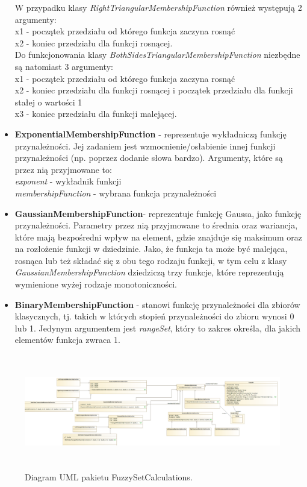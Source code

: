 \documentclass{classrep}
\begin{document}
\begin{itemize}
    W przypadku klasy \textit{RightTriangularMembershipFunction} również występują 2 argumenty:\\
    x1 - początek przedziału od którego funkcja zaczyna rosnąć \\
    x2 - koniec przedziału dla funkcji rosnącej. \\
    Do funkcjonowania klasy \textit{BothSidesTriangularMembershipFunction} niezbędne są natomiast 3 argumenty: \\
    x1 - początek przedziału od którego funkcja zaczyna rosnąć \\
    x2 - koniec przedziału dla funkcji rosnącej i początek przedziału dla funkcji stałej o wartości 1 \\
    x3 - koniec przedziału dla funkcji malejącej.
    \item {\bf ExponentialMembershipFunction} - reprezentuje wykładniczą funkcję przynależności. Jej zadaniem jest wzmocnienie/osłabienie innej funkcji przynależności (np. poprzez dodanie słowa bardzo). Argumenty, które są przez nią przyjmowane to: \\
    \textit{exponent} - wykładnik funkcji \\
    \textit{membershipFunction} - wybrana funkcja przynależności 
    \item {\bf GaussianMembershipFunction}- reprezentuje funkcję Gaussa, jako funkcję przynależności. Parametry przez nią przyjmowane to średnia oraz wariancja, które mają bezpośredni wpływ na element, gdzie znajduje się maksimum oraz na rozłożenie funkcji w dziedzinie. Jako, że funkcja ta może być malejąca, rosnąca lub też składać się z obu tego rodzaju funkcji, w tym celu z klasy \textit{GaussianMembershipFunction} dziedziczą trzy funkcje, które reprezentują wymienione wyżej rodzaje monotoniczności.
    \item {\bf BinaryMembershipFunction} - stanowi funkcję przynależności dla zbiorów klasycznych, tj. takich w których stopień przynależności do zbioru wynosi 0 lub 1. Jedynym argumentem jest \textit{rangeSet}, który to zakres określa, dla jakich elementów funkcja zwraca 1.
\end{itemize}
\begin{figure}[H]
    \centering
    \includegraphics[width=14cm, height=5cm]{fuzzy_set_calculations.png}
    \caption{Diagram UML pakietu FuzzySetCalculations.}
    \label{rysunek:UML_fuzzy_set}
\end{figure}
\end{document}
